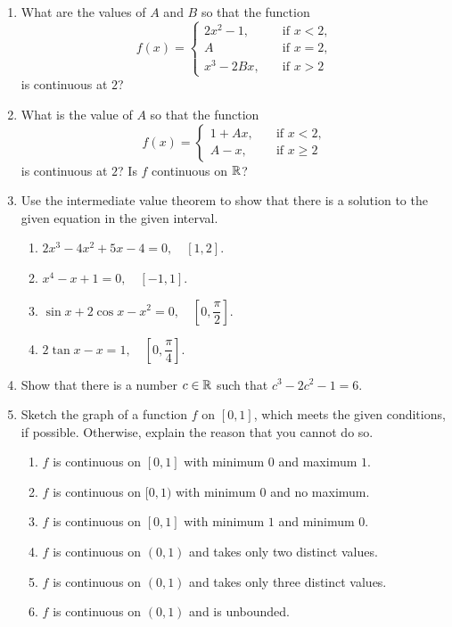 \documentclass[11pt]{book}
\begin{document}
\begin{enumerate}[label=\arabic*.]
    \item What are the values of $A$ and $B$ so that the function $$f(x)=\left\{\begin{array}{ll}
        2x^2-1, \quad & \text{if $x<2$},\\
        A \quad &\text{if $x=2$},\\
        x^3-2Bx, \quad & \text{if $x>2$}
    \end{array}\right.$$ is continuous at $2$?
    \item What is the value of $A$ so that the function $$f(x)=\left\{\begin{array}{ll}
        1+Ax, \quad & \text{if $x<2$},\\
        A-x, \quad & \text{if $x\geq2$}
    \end{array}\right.$$ is continuous at $2$? Is $f$ continuous on $\mathbb{R}$?
    \item Use the intermediate value theorem to show that there is a solution to the given equation in the given interval. 
    \begin{enumerate} \setlength{\delimitershortfall}{0pt}
        \item $2x^3-4x^2+5x-4=0, \quad [1, 2]$.
        \item $x^4-x+1=0, \quad [-1, 1]$.
        \item $\sin x+2\cos x-x^2=0, \quad \left[0, \dfrac{\pi}{2}\right]$.
        \item $2\tan x-x=1,\quad \left[0, \dfrac{\pi}{4}\right]$.
    \end{enumerate} \setlength{\delimitershortfall}{13.5pt}
    \item Show that there is a number $c\in\mathbb{R}$ such that $c^3-2c^2-1=6$.
    \item Sketch the graph of a function $f$ on $[0, 1]$, which meets the given conditions, if possible. Otherwise, explain the reason that you cannot do so.
    \begin{enumerate}
        \item $f$ is continuous on $[0, 1]$ with minimum $0$ and maximum $1$.
        \item $f$ is continuous on $[0, 1)$ with minimum $0$ and no maximum.
        \item $f$ is continuous on $[0, 1]$ with minimum $1$ and minimum $0$.
        \item $f$ is continuous on $(0, 1)$ and takes only two distinct values.
        \item $f$ is continuous on $(0, 1)$ and takes only three distinct values.
        \item $f$ is continuous on $(0, 1)$ and is unbounded.

\end{enumerate}
\end{enumerate}
\end{document}
